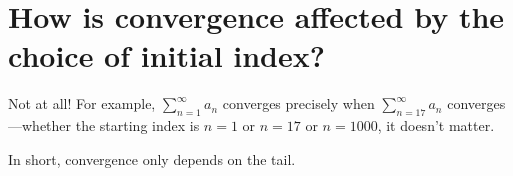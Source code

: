 \documentclass{ximera}
\begin{document}
\section{How is convergence affected by the choice of initial index?}

Not at all!  For example, \(\sum_{n=1}^\infty a_n\) converges precisely when \(\sum_{n=17}^\infty a_n\) converges---whether the starting index is \(n=1\) or \(n = 17\) or \(n = 1000\), it doesn't matter.

In short, convergence only depends on the tail.

\end{document}
